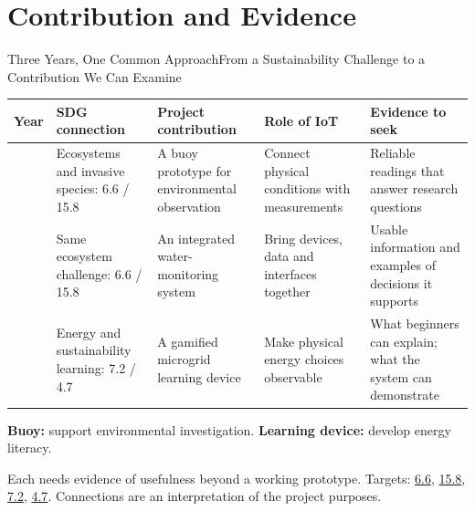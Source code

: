 \part[nopartpage]{Contribution and Evidence}
\begin{frame}{Three Years, One Common Approach}{From a Sustainability Challenge to a Contribution We Can Examine}
\small\renewcommand{\arraystretch}{1.35}
\par\noindent\begin{tabularx}{\textwidth}{@{}>{\raggedright\arraybackslash}p{}>{\raggedright\arraybackslash}p{}>{\raggedright\arraybackslash}X>{\raggedright\arraybackslash}X>{\raggedright\arraybackslash}X@{}}
\toprule
\textbf{Year} & \textbf{SDG connection} & \textbf{Project contribution} & \textbf{Role of IoT} & \textbf{Evidence to seek}\\\midrule
2024 & Ecosystems and invasive species: 6.6 / 15.8 & A buoy prototype for environmental observation & Connect physical conditions with measurements & Reliable readings that answer research questions\\
2025 & Same ecosystem challenge: 6.6 / 15.8 & An integrated water-monitoring system & Bring devices, data and interfaces together & Usable information and examples of decisions it supports\\
2026 & Energy and sustainability learning: 7.2 / 4.7 & A gamified microgrid learning device & Make physical energy choices observable & What beginners can explain; what the system can demonstrate\\\bottomrule
\end{tabularx}\par
\vspace{.9em}
\normalsize\textbf{Buoy:} support environmental investigation.\quad
\textbf{Learning device:} develop energy literacy.\par
\vspace{.4em}\alert{Each needs evidence of usefulness beyond a working prototype.}
\vfill
{\scriptsize Targets: \href{https://sdgs.un.org/goals/goal6}{6.6}, \href{https://sdgs.un.org/goals/goal15}{15.8}, \href{https://sdgs.un.org/goals/goal7}{7.2}, \href{https://sdgs.un.org/goals/goal4}{4.7}. Connections are an interpretation of the project purposes.}
\end{frame}

